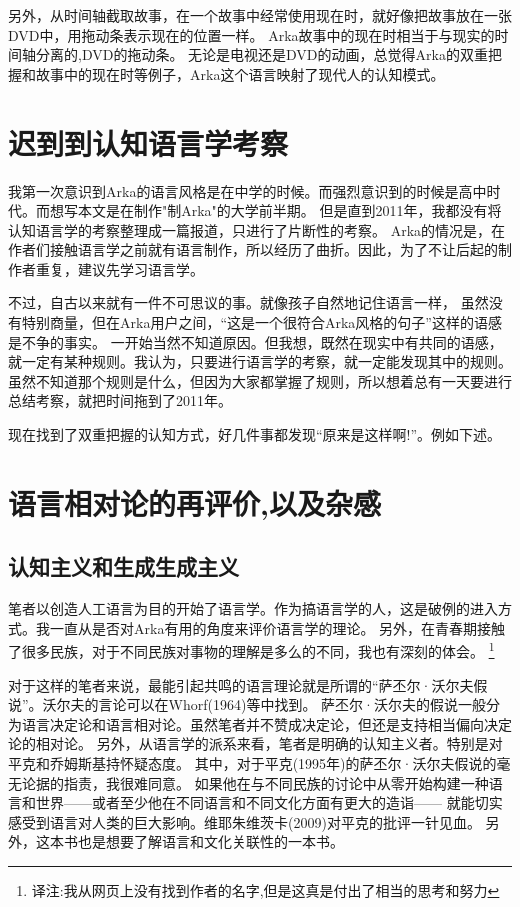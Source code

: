 另外，从时间轴截取故事，在一个故事中经常使用现在时，就好像把故事放在一张DVD中，用拖动条表示现在的位置一样。
Arka故事中的现在时相当于与现实的时间轴分离的,DVD的拖动条。
无论是电视还是DVD的动画，总觉得Arka的双重把握和故事中的现在时等例子，Arka这个语言映射了现代人的认知模式。

\section{迟到到认知语言学考察}
我第一次意识到Arka的语言风格是在中学的时候。而强烈意识到的时候是高中时代。而想写本文是在制作"制Arka"的大学前半期。
但是直到2011年，我都没有将认知语言学的考察整理成一篇报道，只进行了片断性的考察。
Arka的情况是，在作者们接触语言学之前就有语言制作，所以经历了曲折。因此，为了不让后起的制作者重复，建议先学习语言学。

不过，自古以来就有一件不可思议的事。就像孩子自然地记住语言一样，
虽然没有特别商量，但在Arka用户之间，“这是一个很符合Arka风格的句子”这样的语感是不争的事实。
一开始当然不知道原因。但我想，既然在现实中有共同的语感，就一定有某种规则。我认为，只要进行语言学的考察，就一定能发现其中的规则。
虽然不知道那个规则是什么，但因为大家都掌握了规则，所以想着总有一天要进行总结考察，就把时间拖到了2011年。

现在找到了双重把握的认知方式，好几件事都发现“原来是这样啊!”。例如下述。
\section{语言相对论的再评价,以及杂感}
\subsection{认知主义和生成生成主义}
笔者以创造人工语言为目的开始了语言学。作为搞语言学的人，这是破例的进入方式。我一直从是否对Arka有用的角度来评价语言学的理论。
另外，在青春期接触了很多民族，对于不同民族对事物的理解是多么的不同，我也有深刻的体会。
\footnote{译注:我从网页上没有找到作者的名字,但是这真是付出了相当的思考和努力}

对于这样的笔者来说，最能引起共鸣的语言理论就是所谓的“萨丕尔·沃尔夫假说”。沃尔夫的言论可以在Whorf(1964)等中找到。
萨丕尔·沃尔夫的假说一般分为语言决定论和语言相对论。虽然笔者并不赞成决定论，但还是支持相当偏向决定论的相对论。
另外，从语言学的派系来看，笔者是明确的认知主义者。特别是对平克和乔姆斯基持怀疑态度。
其中，对于平克(1995年)的萨丕尔·沃尔夫假说的毫无论据的指责，我很难同意。
如果他在与不同民族的讨论中从零开始构建一种语言和世界------或者至少他在不同语言和不同文化方面有更大的造诣------
就能切实感受到语言对人类的巨大影响。维耶朱维茨卡(2009)对平克的批评一针见血。
另外，这本书也是想要了解语言和文化关联性的一本书。

